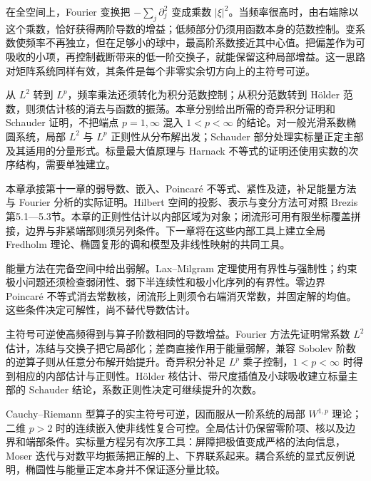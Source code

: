 \ProseParagraphBreak

在全空间上，Fourier 变换把 \(-\sum_j\partial_j^2\) 变成乘数 \(|\xi|^2\)。当频率很高时，由右端除以这个乘数，恰好获得两阶导数的增益；低频部分仍须用函数本身的范数控制。变系数使频率不再独立，但在足够小的球中，最高阶系数接近其中心值。把偏差作为可吸收的小项，再控制截断带来的低一阶交换子，就能保留这种局部增益。这一思路对矩阵系统同样有效，其条件是每个非零实余切方向上的主符号可逆。

\ProseParagraphBreak

从 \(L^2\) 转到 \(L^p\)，频率乘法还须转化为积分范数控制；从积分范数转到 Hölder 范数，则须估计核的消去与函数的振荡。本章分别给出所需的奇异积分证明和 Schauder 证明，不把端点 \(p=1,\infty\) 混入 \(1<p<\infty\) 的结论。对一般光滑系数椭圆系统，局部 \(L^2\) 与 \(L^p\) 正则性从分布解出发；Schauder 部分处理实标量正定主部及其适用的分量形式。标量最大值原理与 Harnack 不等式的证明还使用实数的次序结构，需要单独建立。

\ProseParagraphBreak

本章承接第十一章的弱导数、嵌入、Poincaré 不等式、紧性及迹，补足能量方法与 Fourier 分析的实际证明。Hilbert 空间的投影、表示与变分方法可对照 Brezis 第5.1—5.3节\cite[第5.1—5.3节]{Brezis2011}。本章的正则性估计以内部区域为对象；闭流形可用有限坐标覆盖拼接，边界与非紧端部则须另列条件。下一章将在这些内部工具上建立全局 Fredholm 理论、椭圆复形的调和模型及非线性映射的共同工具。









\begin{chaptersummary}
能量方法在完备空间中给出弱解。Lax--Milgram 定理使用有界性与强制性；约束极小问题还须检查弱闭性、弱下半连续性和极小化序列的有界性。零边界 Poincaré 不等式消去常数核，闭流形上则须令右端消灭常数，并固定解的均值。这些条件决定可解性，尚不替代导数估计。

\ProseParagraphBreak

主符号可逆使高频得到与算子阶数相同的导数增益。Fourier 方法先证明常系数 \(L^2\) 估计，冻结与交换子把它局部化；差商直接作用于能量弱解，兼容 Sobolev 阶数的逆算子则从任意分布解开始提升。奇异积分补足 \(L^p\) 乘子控制，\(1<p<\infty\) 时得到相应的内部估计与正则性。Hölder 核估计、带尺度插值及小球吸收建立标量主部的 Schauder 结论，系数正则性决定可继续提升的次数。

\ProseParagraphBreak

Cauchy--Riemann 型算子的实主符号可逆，因而服从一阶系统的局部 \(W^{1,p}\) 理论；二维 \(p>2\) 时的连续嵌入使非线性复合可控。全局估计仍保留零阶项、核以及边界和端部条件。实标量方程另有次序工具：屏障把极值变成严格的法向信息，Moser 迭代与对数平均振荡把正解的上、下界联系起来。耦合系统的显式反例说明，椭圆性与能量正定本身并不保证逐分量比较。
\end{chaptersummary}

